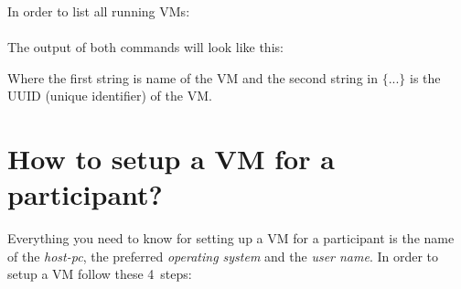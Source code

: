 In order to list all running VMs:\\
\\
The output of both commands will look like this:

Where the first string is name of the VM and the second string in $\{...\}$ is the UUID (unique identifier) of the VM.




\section{How to setup a VM for a participant?}\label{setup}
Everything you need to know for setting up a VM for a participant is the name of the \textit{host-pc}, the preferred \textit{operating system} and the \textit{user name}. In order to setup a VM follow these 4~steps:
